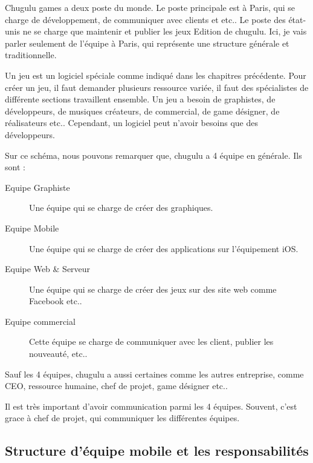 Chugulu games a deux poste du monde. Le poste principale est à Paris, qui se charge de développement, de communiquer avec clients et etc.. Le poste des état-unis ne se charge que maintenir et publier les jeux Edition de chugulu. Ici, je vais parler seulement de l'équipe à Paris, qui représente une structure générale et traditionnelle.

Un jeu est un logiciel spéciale comme indiqué dans les chapitres précédente. Pour créer un jeu, il faut demander plusieurs ressource variée, il faut des spécialistes de différente sections travaillent ensemble. Un jeu a besoin de graphistes, de développeurs, de musiques créateurs, de commercial, de game désigner, de réalisateurs etc.. Cependant, un logiciel peut n'avoir besoins que des développeurs.  

Sur ce schéma, nous pouvons remarquer que, chugulu a 4 équipe en générale. Ils sont : 
\begin{description}
	\item[Equipe Graphiste] Une équipe qui se charge de créer des graphiques. 
	\item[Equipe Mobile] Une équipe qui se charge de créer des applications sur l'équipement iOS.
	\item[Equipe Web \& Serveur] Une équipe qui se charge de créer des jeux sur des site web comme Facebook etc..
	\item[Equipe commercial] Cette équipe se charge de communiquer avec les client, publier les nouveauté, etc..
\end{description}
Sauf les 4 équipes, chugulu a aussi certaines comme les autres entreprise, comme CEO, ressource humaine, chef de projet, game désigner etc..

Il est très important d'avoir communication parmi les 4 équipes. Souvent, c'est grace à chef de projet, qui communiquer les différentes équipes. 


\subsection{Structure d'équipe mobile et les responsabilités} %
\label{sub:structure_d_équipe_mobile_et_les_responsabilités}

